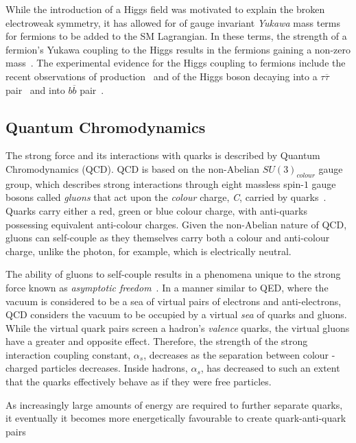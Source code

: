 While the introduction of a Higgs field was motivated to explain the broken electroweak symmetry, it has allowed for of gauge invariant \emph{Yukawa} mass terms for fermions to be added to the SM Lagrangian.
In these terms, the strength of a fermion's Yukawa coupling to the Higgs results in the fermions gaining a non-zero mass~\cite{Cheng:1985bj}.
The experimental evidence for the Higgs coupling to fermions include the recent observations of \ttH production~\cite{Sirunyan:2018hoz} and of the Higgs boson decaying into a $\tau \overline{\tau}$ pair~\cite{CERN-EP-2018-221} and into $b \overline{b}$ pair~\cite{Sirunyan:2017guj}.

\subsection{Quantum Chromodynamics}\label{subsec:QCD}
The strong force and its interactions with quarks is described by Quantum Chromodynamics (QCD).
QCD is based on the non-Abelian $SU(3)_{colour}$ gauge group, which describes strong interactions through eight massless spin-$1$ gauge bosons called \emph{gluons} that act upon the \emph{colour} charge, \emph{C}, carried by quarks~\cite{ElectroweakStrong}.
Quarks carry either a red, green or blue colour charge, with anti-quarks possessing equivalent anti-colour charges.
Given the non-Abelian nature of QCD, gluons can self-couple as they themselves carry both a colour and anti-colour charge, unlike the photon, for example, which is electrically neutral.

The ability of gluons to self-couple results in a phenomena unique to the strong force known as \emph{asymptotic freedom}~\cite{ElectroweakStrong,coughlan2006ideas,devenish2004deep}.
In a manner similar to QED, where the vacuum is considered to be a sea of virtual pairs of electrons and anti-electrons, QCD considers the vacuum to be occupied by a virtual \emph{sea} of quarks and gluons.
While the virtual quark pairs screen a hadron's \emph{valence} quarks, the virtual gluons have a greater and opposite effect. 
Therefore, the strength of the strong interaction coupling constant, $\alpha_{s}$, decreases as the separation between colour -charged particles decreases.
Inside hadrons, $\alpha_{s}$, has decreased to such an extent that the quarks effectively behave as if they were free particles.

As increasingly large amounts of energy are required to further separate quarks, it eventually it becomes more energetically favourable to create quark-anti-quark pairs 

